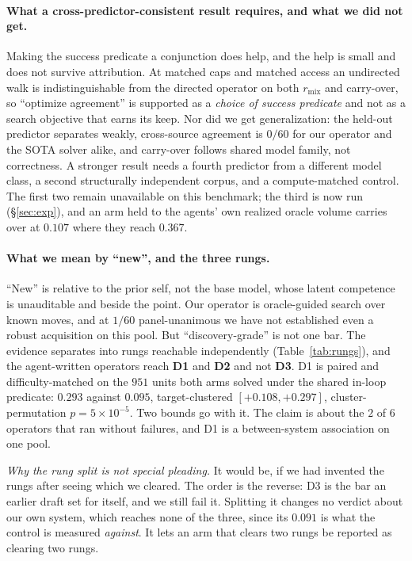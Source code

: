 \documentclass[11pt]{article}
\begin{document}
\paragraph{What a cross-predictor-consistent result requires, and what we did not get.} Making the success
predicate a conjunction does help, and the help is small and does not survive attribution. At matched caps and
matched access an undirected walk is indistinguishable from the directed operator on both $r_{\mathrm{mix}}$
and carry-over, so ``optimize agreement'' is supported as a \emph{choice of success predicate} and not as a
search objective that earns its keep. Nor did we get generalization: the held-out predictor separates weakly,
cross-source agreement is $0/60$ for our operator and the SOTA solver alike, and carry-over follows shared
model family, not correctness. A stronger result needs a fourth predictor from a different model class, a
second structurally independent corpus, and a compute-matched control. The first two remain unavailable on
this benchmark; the third is now run (\S\ref{sec:exp}), and an arm held to the agents' own realized oracle
volume carries over at $0.107$ where they reach $0.367$.

\paragraph{What we mean by ``new'', and the three rungs.} ``New'' is relative to the prior self, not the base
model, whose latent competence is unauditable and beside the point. Our operator is oracle-guided search over
known moves, and at $1/60$ panel-unanimous we have not established even a robust acquisition on this pool.
But ``discovery-grade'' is not one bar. The evidence separates into rungs reachable independently
(Table~\ref{tab:rungs}), and the agent-written operators reach \textbf{D1} and \textbf{D2} and not
\textbf{D3}. D1 is paired and difficulty-matched on the $951$ units both arms solved under the shared in-loop
predicate: $0.293$ against $0.095$, target-clustered $[{+}0.108,{+}0.297]$, cluster-permutation
$p{=}5\!\times\!10^{-5}$. Two bounds go with it. The claim is about the $2$ of $6$ operators that ran without
failures, and D1 is a between-system association on one pool.

\emph{Why the rung split is not special pleading.} It would be, if we had invented the rungs after seeing
which we cleared. The order is the reverse: D3 is the bar an earlier draft set for itself, and we still fail
it. Splitting it changes no verdict about our own system, which reaches none of the three, since its $0.091$
is what the control is measured \emph{against}. It lets an arm that clears two rungs be reported as clearing
two rungs.
\end{document}
